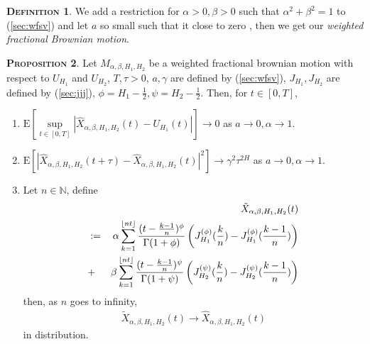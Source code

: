 \documentclass[a4paper, twoside, 11pt]{article}
\theoremstyle{definition}
\newtheorem{definition}{\scshape Definition}[section]
\newtheorem{proposition}[definition]{\scshape Proposition}
\DeclarePairedDelimiter\floor{\lfloor}{\rfloor}
\newcommand{\brkt}[1]{\left({#1} \right)}
\begin{document}
  \begin{definition}
	We add a restriction for $\alpha > 0, \beta > 0$ such that $\alpha^2 + \beta^2 = 1$ to (\ref{sec:wfsv}) and let $a$ so small such that it close to zero , then we get our \emph{weighted fractional Brownian motion}.
  \end{definition}
  
\begin{proposition}
  Let $M_{\alpha,\beta,H_1,H_2}$ be a weighted fractional brownian motion with respect to $U_{H_1}$ and $U_{H_2}$, $T, \tau>0$, $a, \gamma$ are defined by (\ref{sec:wfsv}), $J_{H_1}, J_{H_2}$ are defined by (\ref{sec:jjj}), $\phi=H_1-\frac{1}{2}, \psi=H_2-\frac{1}{2}$. Then, for $t\in [0, T]$,
\begin{enumerate}[topsep=0pt, itemsep=-1ex, partopsep=1ex, parsep=1ex, label=(\roman*)]	
  \item $\mathrm{E}[\sup\limits_{t\in[0,T]}|\hat{X}_{\alpha,\beta,H_1,H_2}(t) - U_{H_1}(t)|] \rightarrow 0$
	as $a\rightarrow 0, \alpha\rightarrow 1$.
  \item $\mathrm{E}[|\hat{X}_{\alpha,\beta,H_1,H_2}(t+\tau) - \hat{X}_{\alpha,\beta,H_1,H_2}(t)|^2] \rightarrow  \gamma^2 \tau^{2H}$
	as $a\rightarrow 0, \alpha\rightarrow 1$.
  \item Let $n\in \mathbb{N}$, define
	\begin{eqnarray*}
	  &&\tilde{X}_{\alpha,\beta,H_1,H_2}(t) \\
	  &:=&  \alpha\sum_{k=1}^{\floor{nt}} \frac{(t - \frac{k-1}{n})^\phi}{\Gamma(1+\phi)} \brkt{J_{H_1}^{(\phi)}(\frac{k}{n}) - J_{H_1}^{(\phi)}(\frac{k-1}{n})} \\
	  &+& \beta\sum_{k=1}^{\floor{nt}} \frac{(t - \frac{k-1}{n})^\psi}{\Gamma(1+\psi)} \brkt{J_{H_2}^{(\psi)}(\frac{k}{n}) - J_{H_2}^{(\psi)}(\frac{k-1}{n})}
	  \label{sec:disc}
	\end{eqnarray*}
	then, as $n$ goes to infinity,
	\begin{eqnarray*}
	  \tilde{X}_{\alpha,\beta,H_1,H_2}(t) \rightarrow \hat{X}_{\alpha,\beta,H_1,H_2}(t)
	\end{eqnarray*}
	in distribution.
  \end{enumerate}
  \end{proposition}
\end{document}
